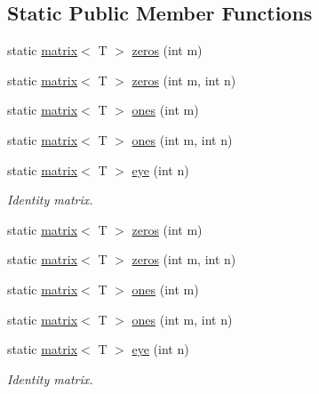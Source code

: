 \subsection*{Static Public Member Functions}
\begin{DoxyCompactItemize}
\item 
static \hyperlink{classlibNumerics_1_1matrix}{matrix}$<$ T $>$ \hyperlink{classlibNumerics_1_1matrix_a21edf9bfe07321e1e3d794106c98780c}{zeros} (int m)
\item 
static \hyperlink{classlibNumerics_1_1matrix}{matrix}$<$ T $>$ \hyperlink{classlibNumerics_1_1matrix_afbb85ec38cb88afa01fa31eb0034efce}{zeros} (int m, int n)
\item 
static \hyperlink{classlibNumerics_1_1matrix}{matrix}$<$ T $>$ \hyperlink{classlibNumerics_1_1matrix_ae80e0aa595e75612e6b41de3a3ccc6ae}{ones} (int m)
\item 
static \hyperlink{classlibNumerics_1_1matrix}{matrix}$<$ T $>$ \hyperlink{classlibNumerics_1_1matrix_a94795c1595cf5615479ee44f541f7b60}{ones} (int m, int n)
\item 
static \hyperlink{classlibNumerics_1_1matrix}{matrix}$<$ T $>$ \hyperlink{classlibNumerics_1_1matrix_a2e6b524d7ae4f6e98a1a41ef8431628c}{eye} (int n)
\begin{DoxyCompactList}\small\item\em Identity matrix. \end{DoxyCompactList}\item 
static \hyperlink{classlibNumerics_1_1matrix}{matrix}$<$ T $>$ \hyperlink{classlibNumerics_1_1matrix_a21edf9bfe07321e1e3d794106c98780c}{zeros} (int m)
\item 
static \hyperlink{classlibNumerics_1_1matrix}{matrix}$<$ T $>$ \hyperlink{classlibNumerics_1_1matrix_afbb85ec38cb88afa01fa31eb0034efce}{zeros} (int m, int n)
\item 
static \hyperlink{classlibNumerics_1_1matrix}{matrix}$<$ T $>$ \hyperlink{classlibNumerics_1_1matrix_ae80e0aa595e75612e6b41de3a3ccc6ae}{ones} (int m)
\item 
static \hyperlink{classlibNumerics_1_1matrix}{matrix}$<$ T $>$ \hyperlink{classlibNumerics_1_1matrix_a94795c1595cf5615479ee44f541f7b60}{ones} (int m, int n)
\item 
static \hyperlink{classlibNumerics_1_1matrix}{matrix}$<$ T $>$ \hyperlink{classlibNumerics_1_1matrix_a2e6b524d7ae4f6e98a1a41ef8431628c}{eye} (int n)
\begin{DoxyCompactList}\small\item\em Identity matrix. \end{DoxyCompactList}\end{DoxyCompactItemize}
